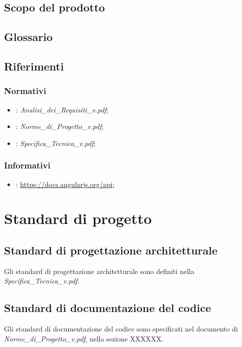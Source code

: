 \subsection{Scopo del prodotto}
\Prodotto{}

\subsection{Glossario}
\Glossario{}

\subsection{Riferimenti}

\subsubsection{Normativi}
\begin{itemize}
\item {}: \emph{Analisi\_{}dei\_{}Requisiti\_{}v\versioneAnalisiDeiRequisiti{}.pdf};
\item {}: \emph{Norme\_{}di\_{}Progetto\_{}v\versioneNormeDiProgetto{}.pdf};
\item {}: \emph{Specifica\_{}Tecnica\_{}v\versioneNormeDiProgetto{}.pdf};
\end{itemize}

\subsubsection{Informativi}
\begin{itemize}
\item {}: \url{https://docs.angularjs.org/api};
\end{itemize}

\newpage
\section{Standard di progetto}
\subsection{Standard di progettazione architetturale}
Gli standard di progettazione architetturale sono definiti nella \emph{Specifica\_{}Tecnica\_{}v\versioneSpecificaTecnica{}.pdf}.

\subsection{Standard di documentazione del codice}
Gli standard di documentazione del codice sono specificati nel documento di 
\emph{Norme\_{}di\_{}Progetto\_{}v\versioneNormeDiProgetto{}.pdf}, nella sezione XXXXXX.	%

